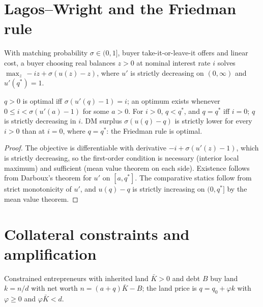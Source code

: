 \section{Lagos--Wright and the Friedman rule}

\begin{definition}
\label{def:lw}
\leanok
With matching probability $\sigma\in(0,1]$, buyer take-it-or-leave-it offers and linear cost, a buyer choosing real
balances $z>0$ at nominal interest rate $i$ solves $\max_z\,-iz+\sigma(u(z)-z)$, where $u'$ is strictly decreasing
on $(0,\infty)$ and $u'(q^*)=1$.
\end{definition}

\begin{theorem}
\label{thm:lw}
\leanok
{}
$q>0$ is optimal iff $\sigma(u'(q)-1)=i$; an optimum exists whenever $0\le i<\sigma(u'(a)-1)$ for some $a>0$. For
$i>0$, $q<q^*$, and $q=q^*$ iff $i=0$; $q$ is strictly decreasing in $i$. DM surplus $\sigma(u(q)-q)$ is strictly
lower for every $i>0$ than at $i=0$, where $q=q^*$: the Friedman rule is optimal.
\end{theorem}
\begin{proof}
\leanok
The objective is differentiable with derivative $-i+\sigma(u'(z)-1)$, which is strictly decreasing, so the
first-order condition is necessary (interior local maximum) and sufficient (mean value theorem on each side).
Existence follows from Darboux's theorem for $u'$ on $[a,q^*]$. The comparative statics follow from strict
monotonicity of $u'$, and $u(q)-q$ is strictly increasing on $(0,q^*]$ by the mean value theorem.
\end{proof}

\section{Collateral constraints and amplification}

\begin{definition}
\label{def:km}
\leanok
Constrained entrepreneurs with inherited land $\bar K>0$ and debt $B$ buy land $k=n/d$ with net worth
$n=(a+q)\bar K - B$; the land price is $q=q_0+\varphi k$ with $\varphi\ge0$ and $\varphi\bar K<d$.
\end{definition}

